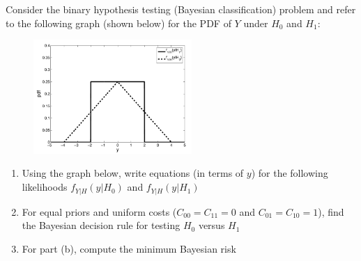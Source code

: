 

\noindent
Consider the binary hypothesis testing (Bayesian classification) problem and refer to the following graph (shown below) for the PDF of $Y$ under $H_0$ and $H_1$:

\begin{figure}[htb]
\centering
\centerline{\includegraphics[width=6cm]{bayesdetection.pdf}}
%
\end{figure}

\begin{enumerate}[label=(\alph*)]
\item Using the graph below, write equations (in terms of $y$) for the following likelihoods $f_{Y|H}(y|H_0)$ and  $f_{Y|H}(y|H_1)$
\item For equal priors and uniform costs ($C_{00} = C_{11} = 0$ and $C_{01} = C_{10} = 1$), find the Bayesian decision rule for testing $H_0$ versus $H_1$
\item For part (b), compute the minimum Bayesian risk
\end{enumerate}
